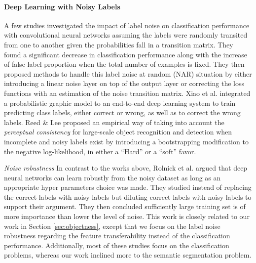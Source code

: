 \paragraph{{Deep Learning with Noisy Labels}}
A few studies\cite{sukhbaatar2014training,patrini2016making} investigated the impact of label noise on classification performance with convolutional neural networks assuming the labels were randomly transited from one to another given the probabilities fall in a transition matrix.
They found a significant decrease in classification performance along with the increase of false label proportion when the total number of examples is fixed.
They then proposed methods to handle this label noise at random (NAR)\cite{frenay2014classification} situation by either introducing a linear noise layer on top of the output layer\cite{sukhbaatar2014training} or correcting the loss functions with an estimation of the noise transition matrix\cite{patrini2016making}.
Xiao et al.\cite{xiao2015learning} integrated a probabilistic graphic model to an end-to-end deep learning system to train predicting class labels, either correct or wrong, as well as to correct the wrong labels.
Reed \& Lee\cite{reed2014training} proposed an empirical way of taking into account the \textit{perceptual consistency} for large-scale object recognition and detection when incomplete and noisy labels exist by introducing a bootstrapping modification to the negative log-likelihood, in either a ``Hard'' or a ``soft'' favor.

\textit{Noise robustness}
In contrast to the works above, Rolnick et al.\cite{rolnick2017deep} argued that deep neural networks can learn robustly from the noisy dataset as long as an appropriate hyper parameters choice was made.
They studied instead of replacing the correct labels with noisy labels but diluting correct labels with noisy labels to support their argument.
They then concluded sufficiently large training set is of more importance than lower the level of noise.
This work is closely related to our work in Section \ref{sec:objectness}, except that we focus on the label noise robustness regarding the feature transferability instead of the classification performance.
Additionally, most of these studies focus on the classification problems, whereas our work inclined more to the semantic segmentation problem.

